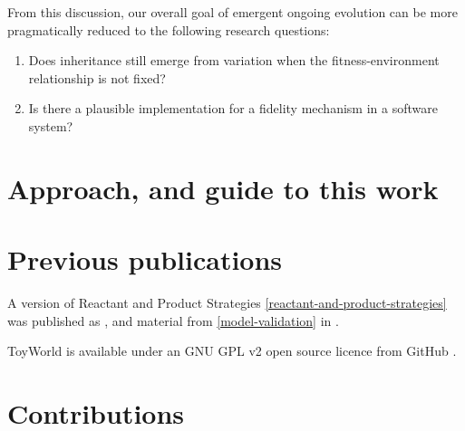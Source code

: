 From this discussion, our overall goal of emergent ongoing evolution can be more pragmatically reduced to the following research questions:

\begin{enumerate}[label=RQ\arabic*:]
	\item Does inheritance still emerge from variation when the fitness-environment relationship is not fixed?
	\item Is there a plausible implementation for a fidelity mechanism in a software system?
\end{enumerate}

\section{Approach, and guide to this work}

\section{Previous publications}\label{previous-publications}

A version of Reactant and Product Strategies \cref{reactant-and-product-strategies} was published as \cite{Young2015},
and material from \cref{model-validation} in \cite{Young2013}.

ToyWorld is available under an GNU GPL v2 open source licence from GitHub \cite{toyworld}.

\section{Contributions}\label{contributions}
